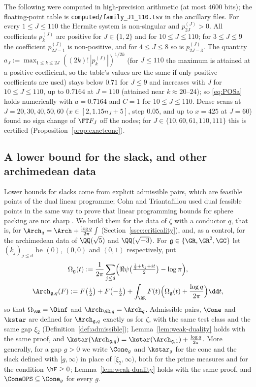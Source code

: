 \begin{observation}\label{obs:family}
The following were computed in high-precision arithmetic (at most $4600$ bits); the floating-point table is
\nolinkurl{computed/family_J1_110.tsv} in the ancillary files. For every $1\le J\le110$ the Hermite system is non-singular and
$p^{(J)}_{2J}>0$. All coefficients $p_k^{(J)}$ are positive for $J\in\{1,2\}$ and for $10\le J\le110$; for $3\le J\le9$ the coefficient
$p^{(J)}_{2J-1}$ is non-positive, and for $4\le J\le8$ so is $p^{(J)}_{2J-3}$. The quantity $a_J:=\max_{1\le k\le2J}((2k)!\,|p_k^{(J)}|)^{1/2k}$ (for $J\le110$ the maximum is attained at a positive
coefficient, so the table's values are the same if only positive coefficients are used) stays below $0.71$ for $J\le9$ and increases with $J$ for $10\le J\le110$, up to $0.7164$ at $J=110$ (attained near $k\approx20$--$24$); so \eqref{eq:POSa} holds
numerically with $a=0.7164$ and $C=1$ for $10\le J\le110$. Dense scans at $J=20,30,40,50,60$ ($x\in[2,1.15n_J+5]$, step $0.05$, and up to
$x=425$ at $J=60$) found no sign change of $\FT F_J$ off the nodes; for $J\in\{10,60,61,110,111\}$ this is certified
(Proposition~\ref{prop:exactcone}).
\end{observation}

\subsection{A lower bound for the slack, and other archimedean data}\label{ssec:otherdata}

Lower bounds for slacks come from explicit admissible pairs, which are feasible points of the dual linear programme; Cohn and
Triantafillou used dual feasible points in the same way to prove that linear programming bounds for sphere packing are not sharp
\cite{CT22}. We build them for the data of $\zeta$ with a conductor $q$, that is, for
$\Arch_q=\Arch+\frac{\log q}{2\pi}\int$ (Section~\ref{ssec:criticality}), and, as a control, for the archimedean data of $\QQ(\sqrt5)$
and $\QQ(\sqrt{-3})$. For $\mathfrak g\in\{\GR,\GR^2,\GC\}$ let $(k_j)_{j\le d}$ be $(0)$, $(0,0)$ and $(0,1)$ respectively, put
\begin{gather*}
\Omega_{\mathfrak g}(t):=\frac1{2\pi}\sum_{j\le d}\Bigl(\Re\psi\bigl(\tfrac{\frac12+k_j+it}{2}\bigr)-\log\pi\Bigr),\\
\Arch_{\mathfrak g,q}(F):=F\bigl(\tfrac i2\bigr)+F\bigl(-\tfrac i2\bigr)+\int_\RR F(t)\Bigl(\Omega_{\mathfrak g}(t)+\frac{\log q}{2\pi}\Bigr)\dd t,
\end{gather*}
so that $\Omega_{\GR}=\Oinf$ and $\Arch_{\GR,q}=\Arch_q$. Admissible pairs, $\Cone$ and $\kstar$ are defined for $\Arch_{\mathfrak g,q}$ exactly as for
$\zeta$, with the same test class and the same gap $\xi_2$ (Definition~\ref{def:admissible}); Lemma~\ref{lem:weak-duality} holds with the
same proof, and $\kstar(\Arch_{\mathfrak g,q})=\kstar(\Arch_{\mathfrak g,1})+\frac{\log q}{2\pi}$. More generally, for a gap $g>0$ we write $\Cone_g$ and $\kstar_g$ for the cone and the slack defined with $[g,\infty)$ in place of
$[\xi_2,\infty)$, both for the prime measures and for the condition $\hF\ge0$; Lemma~\ref{lem:weak-duality} holds with the same proof, and
$\ConeOPS\subseteq\Cone_g$ for every $g$.


